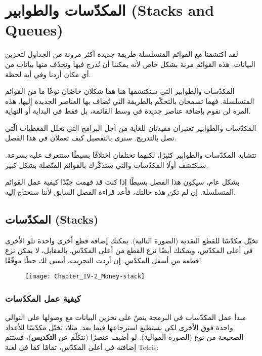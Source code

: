 \chapter{المكدّسات والطوابير (\textenglish{Stacks and Queues})}

لقد اكتشفنا مع القوائم المتسلسلة طريقة جديدة أكثر مرونة من الجداول لتخزين البيانات. هذه القوائم مرنة بشكل خاص لأنه يمكننا أن نُدرج فيها ونحذف منها بيانات من أي مكان أردنا وفي أية لحظة.

المكدّسات والطوابير التي سنكتشفها هنا هما شكلان خاصّان نوعًا ما من القوائم المتسلسلة. فهما تسمحان بالتحكّم بالطريقة التي تُضاف بها العناصر الجديدة إليها. هذه المرة لن نقوم بإضافة عناصر جديدة في وسط القائمة، بل فقط في البداية أو النهاية. 

المكدّسات والطوابير تعتبران مفيدتان للغاية من أجل البرامج التي تحلل المعطيات الّتي تصل بالتدريج. سنرى بالتفصيل كيف تعملان في هذا الفصل.

تتشابه المكدّسات والطوابير كثيرًا، لكنهما تختلفان اختلافًا بسيطًا ستتعرف عليه بسرعة. سنكتشف أولًا المكدّسات والتي ستذكّرك بالقوائم المتّصلة بشكل كبير. 

بشكل عام، سيكون هذا الفصل بسيطًا إذا كنت قد فهمت جيّدًا كيفية عمل القوائم المتسلسلة. إن لم تكن هذه حالتك، فأعد قراءة الفصل السابق لأننا سنحتاج إليه.

\section{المكدّسات (\textenglish{Stacks})}

تخيّل مكدّسًا للقطع النقدية (الصورة التالية). يمكنك إضافة قطع أخرى واحدة تلو الأخرى في أعلى المكدّس، ويمكنك أيضًا نزع القطع من أعلى المكدّس. بالمقابل، لا يمكن نزع قطعة من أسفل المكدّس. إن أردت التجريب، أتمنى لك حظًا موفّقًا!

\begin{figure}[H]
	\centering
	\texttt{[image: Chapter\_IV-2\_Money-stack]}
\end{figure}

\subsection{كيفية عمل المكدّسات}

مبدأ عمل المكدّسات في البرمجة ينصّ على تخزين البيانات مع وصولها على التوالي واحدة فوق الأخرى لكي نستطيع استرجاعها فيما بعد. مثلا، تخيّل مكدّسًا للأعداد الصحيحة من نوع 
(الصورة الموالية). لو أضيف عنصرًا (نتكلّم عن
\textbf{التكديس})،
فستتم إضافته في أعلى المكدّس، تمامًا كما في لعبة 
\textenglish{Tetris}:

